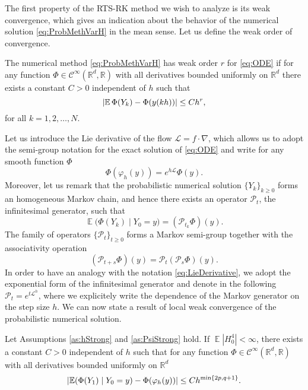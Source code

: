 \documentclass{siamart1116}
\numberwithin{theorem}{section}
\DeclarePairedDelimiter{\abs}{\lvert}{\rvert}
\renewcommand{\phi}{\varphi}
\newcommand{\R}{\mathbb{R}}
\newcommand{\diffL}{\mathcal{L}}
\newcommand{\E}{\operatorname{\mathbb{E}}}
\newcommand{\corr}[1]{{\color{bordeaux}#1}}
\begin{document}
The first property of the RTS-RK method we wish to analyze is its weak convergence, which gives an indication about the behavior of the numerical solution \eqref{eq:ProbMethVarH} in the mean sense. Let us define the weak order of convergence. 
\begin{definition} The numerical method \eqref{eq:ProbMethVarH} has weak order $r$ for \eqref{eq:ODE} if for any function $\Phi\in \mathcal C^\infty(\R^d, \R)$ with all derivatives bounded uniformly on $\R^d$ there exists a constant $C > 0$ independent of $h$ such that
	\begin{equation}
		\abs{\E\Phi(Y_k) - \Phi(y(kh))} \leq Ch^r,
	\end{equation}
	for all $k = 1, 2, \ldots, N$.
\end{definition} 
Let us introduce the Lie derivative of the flow $\diffL = f \cdot \nabla$, which allows us to adopt the semi-group notation for the exact solution of \eqref{eq:ODE} and write for any smooth function $\Phi$
\begin{equation}\label{eq:LieDerivative}
	\Phi(\phi_h(y)) = e^{h\diffL} \Phi(y).
\end{equation}
Moreover, let us remark that the probabilistic numerical solution $\{Y_k\}_{k\geq 0}$ forms an homogeneous Markov chain, and hence there exists an operator $\mathcal{P}_t$, the infinitesimal generator, such that
\begin{equation}
	\E \big(\Phi(Y_{k})\mid Y_0 = y\big) = (\mathcal{P}_{t_k}\Phi)(y).
\end{equation}
The family of operators $\{\mathcal{P}_t\}_{t\geq 0}$ forms a Markov semi-group together with the associativity operation
\begin{equation}
	(\mathcal{P}_{t+s}\Phi)(y) = \mathcal{P}_t(\mathcal{P}_s \Phi)(y).
\end{equation}
In order to \corr{have an analogy with} the notation \eqref{eq:LieDerivative}, we adopt the exponential form of the infinitesimal generator and denote in the following \corr{$\mathcal{P}_t = e^{t\diffL^h}$}, where we explicitely write the dependence of the Markov generator on the step size $h$. We can now state a result of local weak convergence of the probabilistic numerical solution.
\begin{lemma}\label{thm:WeakLocalOrder} Let Assumptions \ref{as:hStrong} and \ref{as:PsiStrong} hold. If $\E|H_0^4| < \infty$, there exists a constant $C > 0$ independent of $h$ such that for any function $\Phi\in \mathcal{C}^{\infty}(\R^d,\R)$ with all derivatives bounded uniformly on $\R^d$
	\begin{equation}
		\abs{\E(\Phi(Y_1)\mid Y_0 = y) - \Phi(\phi_h(y))} \leq C h^{\min\{2p, q+1\}}.
	\end{equation}
\end{lemma}
\end{document}
